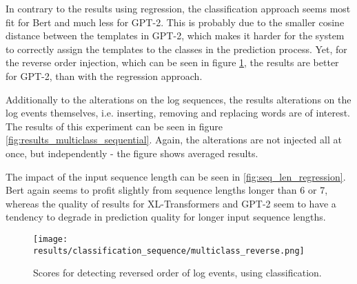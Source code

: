In contrary to the results using regression, the classification approach seems most fit for Bert and much less for GPT-2. This is probably due to the smaller cosine distance between the templates in GPT-2, which makes it harder for the system to correctly assign the templates to the classes in the prediction process. Yet, for the reverse order injection, which can be seen in figure \ref{fig:multiclass_reverse_order}, the results are better for GPT-2, than with the regression approach.

Additionally to the alterations on the log sequences, the results alterations on the log events themselves, i.e. inserting, removing and replacing words are of interest. The results of this experiment can be seen in figure \ref{fig:results_multiclass_sequential}. Again, the alterations are not injected all at once, but independently - the figure shows averaged results.

The impact of the input sequence length can be seen in \ref{fig:seq_len_regression}. Bert again seems to profit slightly from sequence lengths longer than 6 or 7, whereas the quality of results for XL-Transformers and GPT-2 seem to have a tendency to degrade in prediction quality for longer input sequence lengths.


\begin{figure}[h]
  \centering
  \texttt{[image: results/classification\_sequence/multiclass\_reverse.png]}\\
  \caption{Scores for detecting reversed order of log events, using classification.}
  \label{fig:multiclass_reverse_order}
\end{figure}
\begin{figure*}[ht!]
\hspace{\fill}
\hspace{\fill}
   \\
\caption{\label{fig:results_multiclass_sequential}Altering log lines at different ratios, using classification, 5\% anomaly.}
\end{figure*}

